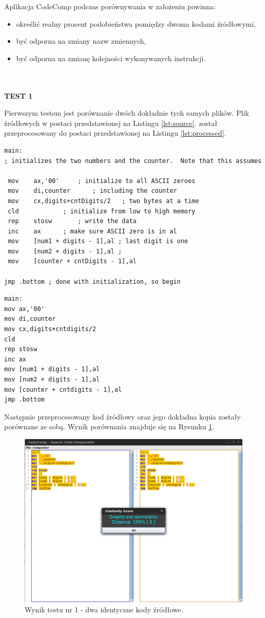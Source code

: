 \documentclass[a4paper,12pt,twoside]{article}
\begin{document}
Aplikacja CodeComp podczas porównywania w założeniu powinna:
\begin{itemize}
\item określić realny procent podobieństwa pomiędzy dwoma kodami źródłowymi,
\item być odporna na zmiany nazw zmiennych,
\item być odporna na zmianę kolejności wykonywanych instrukcji.
\end{itemize}
\\ \\
\textbf{TEST 1}

Pierwszym testem jest porównanie dwóch dokładnie tych samych plików. Plik źródłowych w postaci przedstawionej na Listingu \ref{lst:source}. został przeprocesowany do postaci przedstawionej na Listingu \ref{lst:processed}.
\begin{lstlisting}[caption={Przykładowy oryginalny kod źródłowy.}, label={lst:source}]
main:	
; initializes the two numbers and the counter.  Note that this assumes

 mov	ax,'00'		; initialize to all ASCII zeroes
 mov	di,counter		; including the counter
 mov	cx,digits+cntDigits/2	; two bytes at a time
 cld			; initialize from low to high memory
 rep	stosw		; write the data
 inc	ax		; make sure ASCII zero is in al
 mov	[num1 + digits - 1],al ; last digit is one
 mov	[num2 + digits - 1],al ; 
 mov	[counter + cntDigits - 1],al

jmp	.bottom	; done with initialization, so begin
\end{lstlisting}
\begin{lstlisting}[caption={Przykładowy przeprocesowany kod źródłowy.}, label={lst:processed}]
main:
mov ax,'00'
mov di,counter
mov cx,digits+cntdigits/2
cld
rep stosw
inc ax
mov [num1 + digits - 1],al
mov [num2 + digits - 1],al
mov [counter + cntdigits - 1],al
jmp .bottom
\end{lstlisting}
Następnie przeprocesowany kod źródłowy oraz jego dokładna kopia zostały porównane ze sobą. Wynik porównania znajduje się na Rysunku \ref{fig:test1}.
\begin{figure}[here]
\centering
\includegraphics[scale=0.4]{gfx/test1.png}
\caption{Wynik testu nr 1  - dwa identyczne kody źródłowe.}
\label{fig:test1}
\end{figure}
\end{document}

